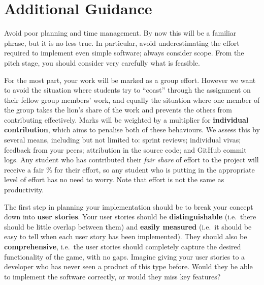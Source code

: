 \documentclass{../../fal_assignment}
\begin{document}
\section*{Additional Guidance}

Avoid poor planning and time management. By now this will be a familiar phrase, but it is no less true.
In particular, avoid underestimating the effort required to implement even simple software; always consider scope.
From the pitch stage, you should consider very carefully what is feasible.

For the most part, your work will be marked as a group effort.
However we want to avoid the situation where students try to ``coast'' through the assignment
on their fellow group members' work,
and equally the situation where one member of the group takes the lion's share of the work
and prevents the others from contributing effectively.
Marks will be weighted by a multiplier for \textbf{individual contribution},
which aims to penalise both of these behaviours.
We assess this by several means, including but not limited to: sprint reviews; individual vivas; feedback from your peers;
attribution in the source code; and GitHub commit logs.
Any student who has contributed their \textit{fair share} of effort to the project will receive a fair \% for their effort,
so any student who is putting in the appropriate level of effort has no need to worry.
Note that effort is not the same as productivity.

The first step in planning your implementation should be to break your concept down into \textbf{user stories}. 
Your user stories should be \textbf{distinguishable} (i.e.\ there should be little overlap between them)
and \textbf{easily measured} (i.e.\ it should be easy to tell when each user story has been implemented).
They should also be \textbf{comprehensive}, i.e.\ the user stories should completely capture the
desired functionality of the game, with no gaps.
Imagine giving your user stories to a developer who has never seen a product of this type before.
Would they be able to implement the software correctly, or would they miss key features?

\end{document}
